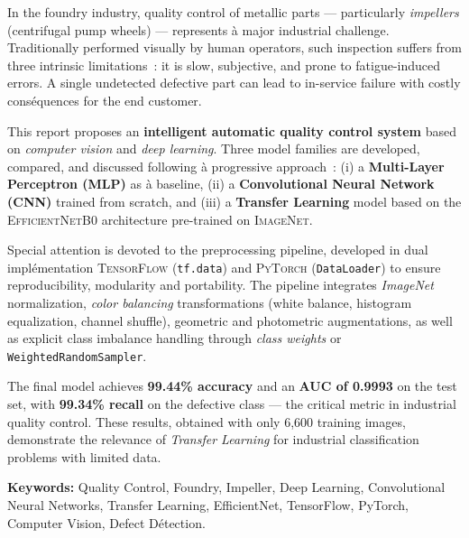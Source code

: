 \documentclass[12pt,a4paper,openany]{report}
\begin{document}
In the foundry industry, quality control of metallic parts --- particularly \emph{impellers} (centrifugal pump wheels) --- represents à major industrial challenge. Traditionally performed visually by human operators, such inspection suffers from three intrinsic limitations~: it is slow, subjective, and prone to fatigue-induced errors. A single undetected defective part can lead to in-service failure with costly conséquences for the end customer.

This report proposes an \textbf{intelligent automatic quality control system} based on \emph{computer vision} and \emph{deep learning}. Three model families are developed, compared, and discussed following à progressive approach~: (i) a \textbf{Multi-Layer Perceptron (MLP)} as à baseline, (ii) a \textbf{Convolutional Neural Network (CNN)} trained from scratch, and (iii) a \textbf{Transfer Learning} model based on the \textsc{EfficientNetB0} architecture pre-trained on \textsc{ImageNet}.

Special attention is devoted to the preprocessing pipeline, developed in dual implémentation \textsc{TensorFlow} (\texttt{tf.data}) and \textsc{PyTorch} (\texttt{DataLoader}) to ensure reproducibility, modularity and portability. The pipeline integrates \emph{ImageNet} normalization, \emph{color balancing} transformations (white balance, histogram equalization, channel shuffle), geometric and photometric augmentations, as well as explicit class imbalance handling through \emph{class weights} or \texttt{WeightedRandomSampler}.

The final model achieves \textbf{99.44\% accuracy} and an \textbf{AUC of 0.9993} on the test set, with \textbf{99.34\% recall} on the defective class --- the critical metric in industrial quality control. These results, obtained with only 6{,}600 training images, demonstrate the relevance of \emph{Transfer Learning} for industrial classification problems with limited data.

\vspace{0.4cm}
\noindent\textbf{Keywords:} Quality Control, Foundry, Impeller, Deep Learning, Convolutional Neural Networks, Transfer Learning, EfficientNet, TensorFlow, PyTorch, Computer Vision, Defect Détection.

\tableofcontents
\thispagestyle{fancy}

\listoffigures
{}
\thispagestyle{fancy}
\end{document}
